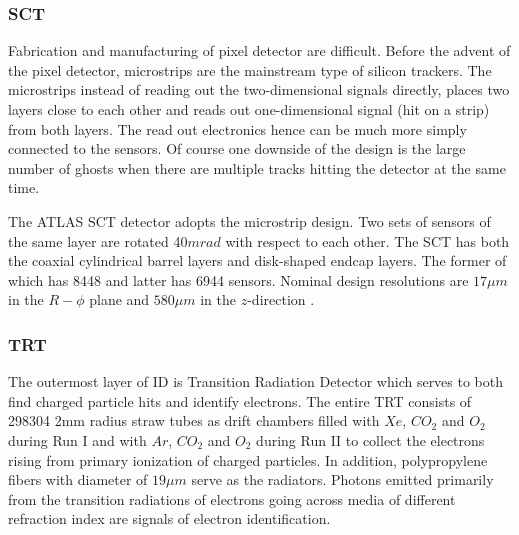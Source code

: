 \subsubsection{SCT}

Fabrication and manufacturing of pixel detector are difficult. Before the advent of the pixel detector, microstrips are the mainstream type of silicon trackers. The microstrips instead of reading out the two-dimensional signals directly, places two layers close to each other and reads out one-dimensional signal (hit on a strip) from both layers. The read out electronics hence can be much more simply connected to the sensors. Of course one downside of the design is the large number of ghosts when there are multiple tracks hitting the detector at the same time.

The ATLAS SCT detector adopts the microstrip design. Two sets of sensors of the same layer are rotated 40$mrad$ with respect to each other. The SCT has both the coaxial cylindrical barrel layers and disk-shaped endcap layers. The former of which has 8448 and latter has 6944 sensors\cite{SCTpaper}. Nominal design resolutions are $17\mu m$ in the $R-\phi$ plane and $580 \mu m$ in the $z$-direction \cite{PERF-2007-01}.


\subsubsection{TRT}

The outermost layer of ID is Transition Radiation Detector which serves to both find charged particle hits and identify electrons. The entire TRT consists of 298304 2mm radius straw tubes\cite{TRTpaper} as drift chambers filled with $Xe$, $CO_2$ and $O_2$ during Run I and with $Ar$, $CO_2$ and $O_2$ during Run II to collect the electrons rising from primary ionization of charged particles. In addition, polypropylene fibers with diameter of $19\mu m$ serve as the radiators. Photons emitted primarily from the transition radiations of electrons going across media of different refraction index are signals of electron identification.
